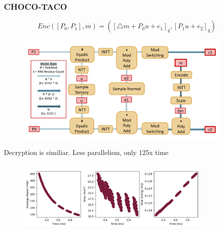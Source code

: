 \documentclass[10pt,handout]{beamer}
\begin{document}
\begin{frame}[noframenumbering]

\frametitle{CHOCO-TACO}
    \vspace{-0.5cm}
\begin{equation*}
    Enc([P_0,P_1],m) = ([\triangle m + P_0u+e_1]_q, [P_1u+e_2]_q)
\end{equation*}
\pause
    \vspace{-1.cm}
\begin{figure}
    \includegraphics[width=0.95\textwidth]{pipeline.png}
\end{figure}
    \vspace{-0.5cm}

Decryption is similiar. Less parallelism, only 125x time




\end{frame}

\begin{frame}[noframenumbering]
\frametitle{}
\begin{figure}
    \includegraphics[width=0.85\textwidth]{design-space.png}
\end{figure}
\end{frame}
\end{document}
